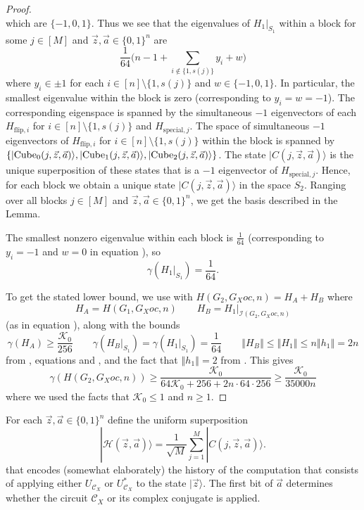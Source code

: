 \documentclass[../thesis-main/thesis-main]{subfiles}
\begin{document}
\begin{proof}
\[\]
which are $\{-1,0,1\}$. Thus we see that the eigenvalues of $H_1|_{S_{1}}$ within a block for some $j\in [M]$ and $\vec{z},\vec{a}\in\{0,1\}^{n}$ are
\begin{equation}
  \frac{1}{64}\bigg(n-1+\sum_{i\notin\{1,s(j)\}}y_{i}+w\bigg)
  \label{eq:block_eig}
\end{equation}
where $y_{i}\in\pm1$ for each $i\in[n]\setminus\{1,s(j)\}$ and $w\in\{-1,0,1\}$. In particular, the smallest eigenvalue within the block is zero (corresponding to $y_i=w=-1$). The corresponding eigenspace is spanned by the simultaneous $-1$ eigenvectors of each $H_{\mathrm{flip},i}$ for $i\in [n]\setminus \{1,s(j)\}$ and $H_{\mathrm{special},j}$. The space of simultaneous $-1$ eigenvectors of $H_{\mathrm{flip},i}$ for $i\in [n]\setminus\{1,s(j)\}$ within the block is spanned by $\{|{\operatorname{Cube}_{0}(j,\vec{z},\vec{a})}\rangle, |{\operatorname{Cube}_{1}(j,\vec{z},\vec{a})}\rangle, |{\operatorname{Cube}_{2}(j,\vec{z},\vec{a})}\rangle\}$. The state $|C(j,\vec{z},\vec{a})\rangle$  is the unique superposition of these states that is a $-1$ eigenvector of $H_{\mathrm{special},j}$. Hence, for each block we obtain a unique state $|C(j,\vec{z},\vec{a})\rangle$ in the space $S_2$. Ranging over all blocks $j\in [M]$ and $\vec{z},\vec{a}\in \{0,1\}^n$, we get the basis described in the Lemma.

The smallest nonzero eigenvalue within each block is $\frac{1}{64}$ (corresponding to $y_{i}=-1$ and $w=0$ in equation ), so 
\begin{equation}
\gamma(H_{1}|_{S_{1}})=\frac{1}{64}.\label{eq:lowerbnd_H1S_alph}
\end{equation}

To get the stated lower bound, we use  with $H(G_{2},G_Xoc,n) = H_{A}+H_{B}$ where 
\[
H_{A}=H(G_{1},G_Xoc,n)\qquad H_{B}=H_{1}|_{\mathcal{I}(G_{2},G_Xoc,n)}
\]
(as in equation ), along with the bounds 
\[
\gamma(H_{A}) \geq \frac{\mathcal{K}_0}{256}\qquad\gamma(H_{B}|_{S_{1}})=\gamma(H_{1}|_{S_{1}})=\frac{1}{64}\qquad\left\Vert H_{B}\right\Vert \leq\left\Vert H_{1}\right\Vert \leq n\left\Vert h_{1}\right\Vert =2n
\]
from , equations  and , and the fact that $\left\Vert h_{1}\right\Vert =2$ from . This gives
\[
  \gamma(H(G_2,G_Xoc,n))
  \geq \frac{\mathcal{K}_0}{64\mathcal{K}_0+256+2n\cdot64\cdot256}
  \geq \frac{\mathcal{K}_0}{35000n}
\]
where we used the facts that $\mathcal{K}_0\leq 1$ and $n \ge 1$.
\end{proof}
For each $\vec{z},\vec{a}\in\{0,1\}^{n}$ define the uniform superposition
\[
  |\mathcal{H}(\vec{z},\vec{a})\rangle
  =\frac{1}{\sqrt{M}}\sum_{j=1}^{M}|C\left(j,\vec{z},\vec{a}\right)\rangle.
\]
that encodes (somewhat elaborately) the history of the computation that consists of applying either $U_{\mathcal{C}_X}$ or $U_{\mathcal{C}_X}^{*}$ to the state $|\vec{z}\rangle$. The first bit of $\vec{a}$ determines whether the circuit $\mathcal{C}_{X}$ or its complex conjugate is applied. 
\end{document}
